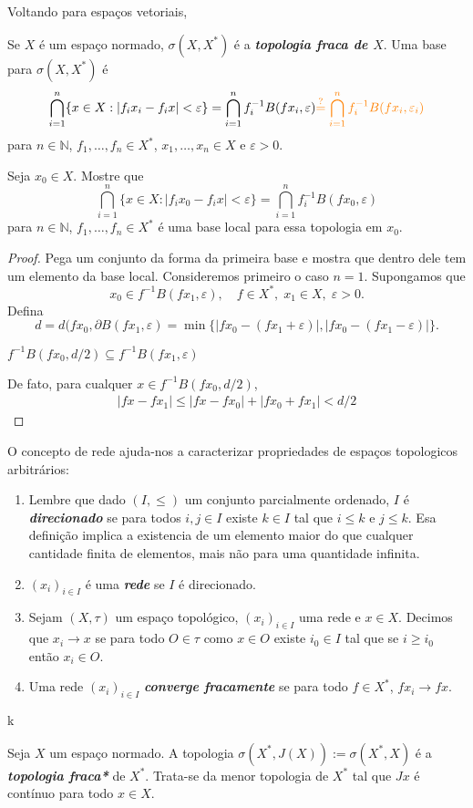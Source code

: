 \documentclass[portuguese]{article}
\theoremstyle{definition}
\newcommand{\N}{\mathbb{N}}
\begin{document}
	Voltando para espaços vetoriais,
	\begin{defn}
		Se $X$ é um espaço normado, $\sigma(X,X^*)$ é a \textbf{\textit{topologia fraca de $X$}}. Uma base para $\sigma(X,X^*)$ é
		\[\bigcap_{i=1}^n\{x\in X:|f_ix_i-f_ix|<\varepsilon\}=\bigcap_{i=1}^nf_i^{-1}B(fx_i,\varepsilon){\color{orange}\overset{?}{=}\bigcap_{i=1}^nf_i^{-1}B(fx_i,\varepsilon_i)}\]
		para $n\in\N$, $f_1,\ldots,f_n\in X^*$, $x_1,\ldots,x_n\in X$ e $\varepsilon>0$.
	\end{defn}
	\begin{exer*}
		Seja $x_0\in X$. Mostre que
		\[\bigcap_{i=1}^n\{x\in X:|f_ix_0-f_ix|<\varepsilon\}=\bigcap_{i=1}^nf_i^{-1}B(fx_0,\varepsilon)\]
		para $n\in\N$, $f_1,\ldots,f_n\in X^*$ é uma base local para essa topologia em $x_0$.
	\end{exer*}
	\begin{proof}
		Pega um conjunto da forma da primeira base e mostra que dentro dele tem um elemento da base local. Consideremos primeiro o caso $n=1$. Supongamos que
		\[x_0\in f^{-1}B(fx_1,\varepsilon),\quad f\in X^*,\;x_1\in X,\;\varepsilon>0.\]
		Defina
		\[d=d(fx_0,\partial B(fx_1,\varepsilon)=\min\{|fx_0-(fx_1+\varepsilon)|,|fx_0-(fx_1-\varepsilon)|\}.\]
		\begin{af*}
			$f^{-1}B(fx_0,d/2)\subseteq f^{-1}B(fx_1,\varepsilon)$
		\end{af*}
		De fato, para cualquer $x\in  f^{-1}B(fx_0,d/2)$,
		\begin{align*}
			|fx-fx_1|\leq|fx-fx_0|+|fx_0+fx_1|<d/2
		\end{align*}
	\end{proof}
	
	O concepto de rede ajuda-nos a caracterizar propriedades de espaços topologicos arbitrários:
	\begin{defn}\leavevmode
		\begin{enumerate}
			\item Lembre que dado $(I,\leq)$ um conjunto parcialmente ordenado, $I$ é \textbf{\textit{direcionado}} se para todos $i,j\in I$ existe $k\in I$ tal que $i\leq k$ e $j\leq k$. Esa definição implica a existencia de um elemento maior do que cualquer cantidade finita de elementos, mais não para uma quantidade infinita. 
			\item $(x_i)_{i\in I}$ é uma \textbf{\textit{rede}} se $I$ é direcionado.
			\item Sejam $(X,\tau)$ um espaço topológico, $(x_i)_{i\in I}$ uma rede e $x\in X$. Decimos que $x_i\to x$ se para todo $O\in\tau$ como $x\in O$ existe $i_0\in I$ tal que se $i\geq i_0$ então $x_i\in O$.
			\item Uma rede $(x_i)_{i\in I}$ \textbf{\textit{converge fracamente}} se para todo $f\in X^*$, $fx_i\to fx$.
		\end{enumerate}
	\end{defn}
	k
	\begin{defn}
		Seja $X$ um espaço normado. A topologia $\sigma(X^*,J(X)):=\sigma(X^*,X)$ é a \textbf{\textit{topologia fraca*}} de $X^*$. Trata-se da menor topologia de $X^*$ tal que $Jx$ é contínuo para todo $x\in X$.
	\end{defn}
	
\end{document}
